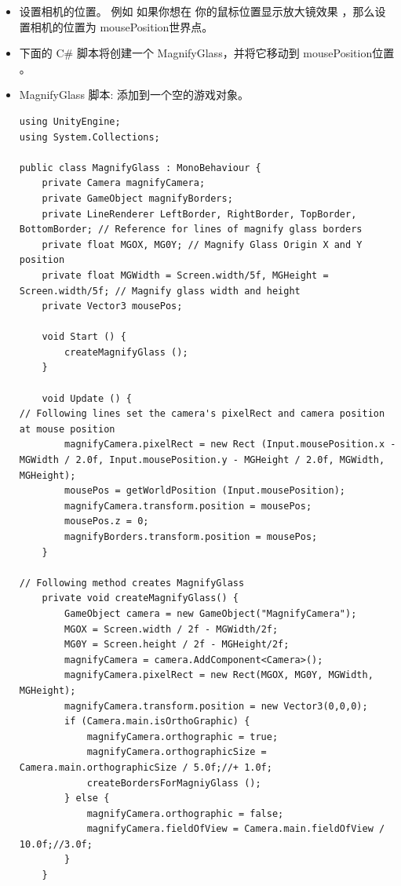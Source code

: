 \documentclass[9pt, b5paper]{article}
\begin{document}
\begin{itemize}
\item 设置相机的位置。  例如 如果你想在 你的鼠标位置显示放大镜效果  ，那么设置相机的位置为 mousePosition世界点。
\item 下面的 C\# 脚本将创建一个  MagnifyGlass，并将它移动到 mousePosition位置 。
\item MagnifyGlass 脚本:   添加到一个空的游戏对象。

\begin{verbatim}
using UnityEngine;
using System.Collections;
 
public class MagnifyGlass : MonoBehaviour {
    private Camera magnifyCamera;
    private GameObject magnifyBorders;
    private LineRenderer LeftBorder, RightBorder, TopBorder, BottomBorder; // Reference for lines of magnify glass borders
    private float MGOX, MG0Y; // Magnify Glass Origin X and Y position
    private float MGWidth = Screen.width/5f, MGHeight = Screen.width/5f; // Magnify glass width and height
    private Vector3 mousePos;
 
    void Start () {
        createMagnifyGlass ();
    }
    
    void Update () {
// Following lines set the camera's pixelRect and camera position at mouse position
        magnifyCamera.pixelRect = new Rect (Input.mousePosition.x - MGWidth / 2.0f, Input.mousePosition.y - MGHeight / 2.0f, MGWidth, MGHeight);
        mousePos = getWorldPosition (Input.mousePosition);
        magnifyCamera.transform.position = mousePos;
        mousePos.z = 0;
        magnifyBorders.transform.position = mousePos;
    }
 
// Following method creates MagnifyGlass
    private void createMagnifyGlass() {
        GameObject camera = new GameObject("MagnifyCamera");
        MGOX = Screen.width / 2f - MGWidth/2f;
        MG0Y = Screen.height / 2f - MGHeight/2f;
        magnifyCamera = camera.AddComponent<Camera>();
        magnifyCamera.pixelRect = new Rect(MGOX, MG0Y, MGWidth, MGHeight);
        magnifyCamera.transform.position = new Vector3(0,0,0);
        if (Camera.main.isOrthoGraphic) {
            magnifyCamera.orthographic = true;
            magnifyCamera.orthographicSize = Camera.main.orthographicSize / 5.0f;//+ 1.0f;
            createBordersForMagniyGlass ();
        } else {
            magnifyCamera.orthographic = false;
            magnifyCamera.fieldOfView = Camera.main.fieldOfView / 10.0f;//3.0f;
        }
    }
 

\end{verbatim}
\end{itemize}
\end{document}
